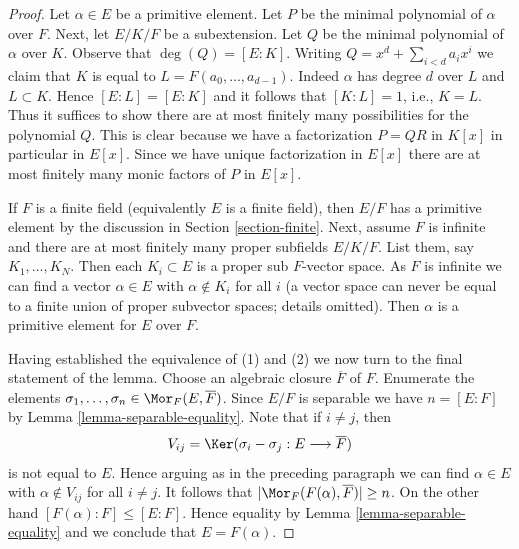 \begin{proof}
Let $\alpha \in E$ be a primitive element. Let $P$ be the minimal
polynomial of $\alpha$ over $F$. Next, let $E/K/F$ be a subextension.
Let $Q$ be the minimal polynomial of $\alpha$ over $K$. Observe that
$\deg(Q) = [E : K]$. Writing $Q = x^d + \sum_{i < d} a_i x^i$ we claim that
$K$ is equal to $L = F(a_0, \ldots, a_{d - 1})$. Indeed $\alpha$ has degree
$d$ over $L$ and $L \subset K$. Hence $[E : L] = [E : K]$ and it follows
that $[K : L] = 1$, i.e., $K = L$.
Thus it suffices to show there are at most finitely many possibilities
for the polynomial $Q$. This is clear because we have a factorization
$P = QR$  in $K[x]$ in particular in $E[x]$. Since we have unique
factorization in $E[x]$ there are at most finitely many monic
factors of $P$ in $E[x]$.

\medskip\noindent
If $F$ is a finite field (equivalently $E$ is a finite field), then
$E/F$ has a primitive element by the discussion in
Section \ref{section-finite}.
Next, assume $F$ is infinite and there are at most finitely many proper
subfields $E/K/F$. List them, say $K_1, \ldots, K_N$. Then
each $K_i \subset E$ is a proper sub $F$-vector space. As $F$ is infinite
we can find a vector $\alpha \in E$ with $\alpha \not \in K_i$ for all $i$
(a vector space can never be equal to a finite union of proper subvector spaces;
details omitted). Then $\alpha$ is a primitive element for $E$ over $F$.

\medskip\noindent
Having established the equivalence of (1) and (2) we now turn to
the final statement of the lemma. Choose an algebraic closure
$\overline{F}$ of $F$. Enumerate the elements
$\sigma_1, \ldots, \sigma_n \in \Mor_F(E, \overline{F})$.
Since $E/F$ is separable we have $n = [E : F]$ by
Lemma \ref{lemma-separable-equality}.
Note that if $i \not = j$, then
$$
V_{ij} = \Ker(\sigma_i - \sigma_j : E \longrightarrow \overline{F})
$$
is not equal to $E$. Hence arguing as in the preceding paragraph
we can find $\alpha \in E$ with $\alpha \not \in V_{ij}$ for all
$i \not = j$. It follows that $|\Mor_F(F(\alpha), \overline{F})| \geq n$.
On the other hand $[F(\alpha) : F] \leq [E : F]$. Hence equality
by Lemma \ref{lemma-separable-equality}
and we conclude that $E = F(\alpha)$.
\end{proof}






